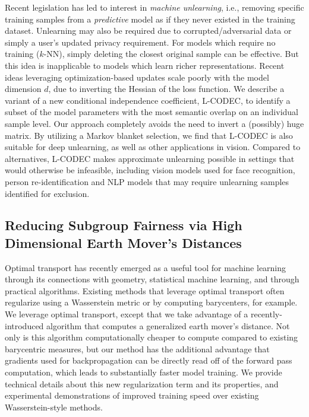 Recent legislation has
led to interest in {\em machine unlearning}, i.e., removing specific training samples from a {\em predictive} model as if they never existed in the training dataset. 
Unlearning may also be required due to  corrupted/adversarial data or simply a user's updated privacy requirement.
For models which require no training ($k$-NN), 
simply deleting the closest original sample can be effective. 
But this idea is inapplicable to models which learn richer 
representations.
Recent ideas leveraging optimization-based updates
scale poorly with the model dimension $d$,  
due to 
inverting the Hessian of the loss function. %
We describe
a variant of a new conditional independence coefficient, 
L-CODEC, to identify a subset of the model parameters with the most semantic overlap on an individual sample level. 
Our approach completely avoids the need to invert a (possibly) huge matrix. 
By utilizing a Markov blanket selection, 
we find
that L-CODEC is also suitable for deep unlearning,
as well as other applications in vision.
Compared to alternatives, L-CODEC makes approximate unlearning possible 
in settings that would otherwise be infeasible, 
including vision models used for face recognition, 
person re-identification 
and NLP models that may require unlearning samples identified for exclusion.


\subsection{Reducing Subgroup Fairness via High Dimensional Earth Mover's Distances}

Optimal transport has recently emerged as a useful tool for machine learning through its connections with geometry, statistical machine learning, and through practical algorithms. Existing methods that leverage optimal transport often  regularize using  a Wasserstein metric or by computing barycenters, for example. %
We leverage optimal transport, except that we take advantage of a recently-introduced algorithm that computes a generalized earth mover's distance.
Not only is this algorithm computationally cheaper to compute compared to existing barycentric measures, but our method has the additional  advantage that gradients used for backpropagation can be directly read off of the forward pass computation, which leads to substantially faster model training.
We provide technical details about this new regularization term and its properties, 
and 
experimental demonstrations of improved training speed over existing Wasserstein-style methods.

